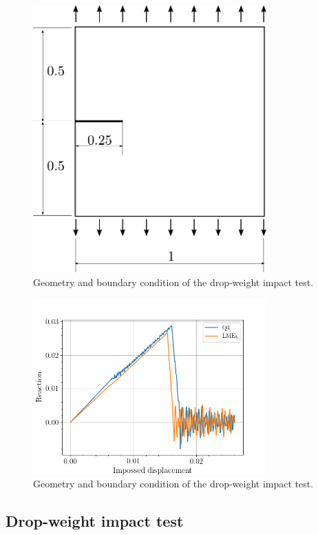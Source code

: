 \documentclass[preprint,12pt,a4paper]{elsarticle}
\begin{document}
\begin{figure}
  \centering
  \includegraphics[width=0.8\textwidth]{Figures/Mode_I}
  \caption{Geometry and boundary condition of the drop-weight impact test.}
  \label{fig:geometry-cracked-panel-mode-I}
\end{figure}

\begin{figure}
  \centering
  \includegraphics[width=0.8\textwidth]{Figures/Reactions_displacements_square_panel_mode_I}
  \caption{Geometry and boundary condition of the drop-weight impact test.}
  \label{fig:geometry-cracked-panel-mode-I}
\end{figure}


\subsection{Drop-weight impact test}
\label{sec:3.3}
\end{document}

